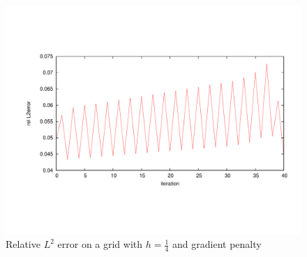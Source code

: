 \begin{figure}[H]
	\centering
	\includegraphics[trim = 2cm 4cm 1cm 4cm, scale=0.5]{plots/oscillation.pdf}
	\caption{Relative $L^2$ error on a grid with $h=\frac 1 4$ and gradient penalty}
	\label{fig: oscillation}
\end{figure}

